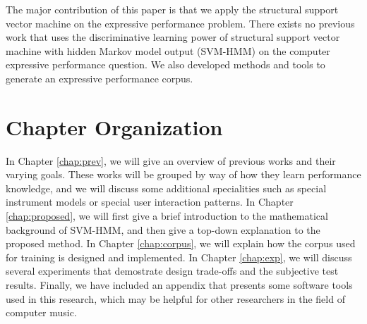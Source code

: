 The major contribution of this paper is that we apply the structural support vector machine on the expressive performance problem. There exists no previous work that uses the discriminative learning power of structural support vector machine with hidden Markov model output (SVM-HMM) on the computer expressive performance question. We also developed methods and tools to generate an expressive performance corpus.
%
%
\section{Chapter Organization}
In Chapter \ref{chap:prev}, we will give an overview of previous works and their varying goals. These works will be grouped by way of how they learn performance knowledge, and we will discuss some additional specialities such as special instrument models or special user interaction patterns. In Chapter \ref{chap:proposed}, we will first give a brief introduction to the mathematical background of SVM-HMM, and then give a top-down explanation to the proposed method. In Chapter \ref{chap:corpus}, we will explain how the corpus used for training is designed and implemented. In Chapter \ref{chap:exp}, we will discuss several experiments that demostrate design trade-offs and the subjective test results. Finally, we have included an appendix that presents some software tools used in this research, which may be helpful for other researchers in the field of computer music.
